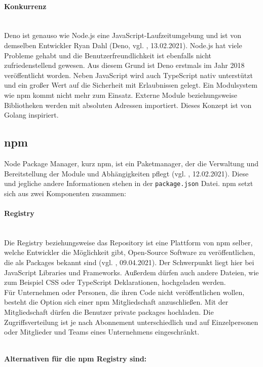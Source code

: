 \paragraph{Konkurrenz}
\mbox{}\\
Deno ist genauso wie Node.js eine JavaScript-Laufzeitumgebung und ist von demselben Entwickler Ryan Dahl (Deno, vgl. \cite{deno_2021}, 13.02.2021). Node.js hat viele Probleme gehabt und die Benutzerfreundlichkeit ist ebenfalls nicht zufriedenstellend gewesen. Aus diesem Grund ist Deno erstmals im Jahr 2018 veröffentlicht worden. Neben JavaScript wird auch TypeScript nativ unterstützt und ein großer Wert auf die Sicherheit mit Erlaubnissen gelegt. Ein Modulsystem wie npm kommt nicht mehr zum Einsatz. Externe Module beziehungsweise Bibliotheken werden mit absoluten Adressen importiert. Dieses Konzept ist von Golang inspiriert.

\subsection{npm}
Node Package Manager, kurz npm, ist ein Paketmanager, der die Verwaltung und Bereitstellung der Module und Abhängigkeiten pflegt (vgl. \cite{npm_2021}, 12.02.2021). Diese und jegliche andere Informationen stehen in der \texttt{package.json} Datei. npm setzt sich aus zwei Komponenten zusammen:

\paragraph{Registry}
\mbox{}\\
Die Registry beziehungsweise das Repository ist eine Plattform von npm selber, welche Entwickler die Möglichkeit gibt, Open-Source Software zu veröffentlichen, die als Packages bekannt sind (vgl. \cite{npm_registry_2021}, 09.04.2021). Der Schwerpunkt liegt hier bei JavaScript Libraries und Frameworks. Außerdem dürfen auch andere Dateien, wie zum Beispiel CSS oder TypeScript Deklarationen, hochgeladen werden.
\\
Für Unternehmen oder Personen, die ihren Code nicht veröffentlichen wollen, besteht die Option sich einer npm Mitgliedschaft anzuschließen. Mit der Mitgliedschaft dürfen die Benutzer private packages hochladen. Die Zugriffsverteilung ist je nach Abonnement unterschiedlich und auf Einzelpersonen oder Mitglieder und Teams eines Unternehmens eingeschränkt.

\mbox{}\\
\textbf{Alternativen für die npm Registry sind:}


